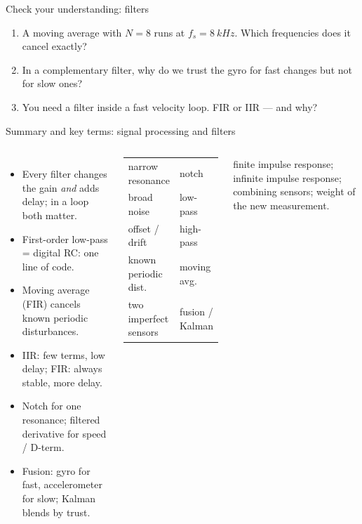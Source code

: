 \documentclass[aspectratio=169,10pt]{beamer}
\begin{document}
\begin{frame}{Check your understanding: filters}
\begin{keybox}
\large
\begin{enumerate}
\item A moving average with $N=8$ runs at $f_s=\SI{8}{kHz}$. Which frequencies does it cancel exactly?
\item In a complementary filter, why do we trust the gyro for fast changes but not for slow ones?
\item You need a filter inside a fast velocity loop. FIR or IIR --- and why?
\end{enumerate}
\end{keybox}
\end{frame}


\begin{frame}{Summary and key terms: signal processing and filters}
\begin{columns}[T]
\begin{itemize}\small
\item Every filter changes the gain \emph{and} adds delay; in a loop both matter.
\item First-order low-pass = digital RC: one line of code.
\item Moving average (FIR) cancels known periodic disturbances.
\item IIR: few terms, low delay; FIR: always stable, more delay.
\item Notch for one resonance; filtered derivative for speed / D-term.
\item Fusion: gyro for fast, accelerometer for slow; Kalman blends by trust.
\end{itemize}
\begin{keybox}
\small
\begin{tabular}{@{}l l@{}}
narrow resonance & notch\\
broad noise & low-pass\\
offset / drift & high-pass\\
known periodic dist. & moving avg.\\
two imperfect sensors & fusion / Kalman\\
\end{tabular}
\end{keybox}
{\small {} finite impulse response;  infinite impulse response;  combining sensors;  weight of the new measurement.}
\end{columns}
\end{frame}
\end{document}
